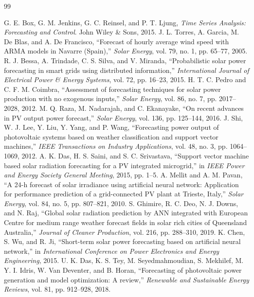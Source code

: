 \documentclass[conference]{IEEEtran}
\begin{document}
\begin{thebibliography}{99}

 G. E. Box, G. M. Jenkins, G. C. Reinsel, and P. T. Ljung, \textit{Time Series Analysis: Forecasting and Control}. John Wiley \& Sons, 2015.
 J. L. Torres, A. Garcia, M. De Blas, and A. De Francisco, ``Forecast of hourly average wind speed with ARMA models in Navarre (Spain),'' \textit{Solar Energy}, vol. 79, no. 1, pp. 65--77, 2005.
 R. J. Bessa, A. Trindade, C. S. Silva, and V. Miranda, ``Probabilistic solar power forecasting in smart grids using distributed information,'' \textit{International Journal of Electrical Power \& Energy Systems}, vol. 72, pp. 16--23, 2015.
 H. T. C. Pedro and C. F. M. Coimbra, ``Assessment of forecasting techniques for solar power production with no exogenous inputs,'' \textit{Solar Energy}, vol. 86, no. 7, pp. 2017--2028, 2012.
 M. Q. Raza, M. Nadarajah, and C. Ekanayake, ``On recent advances in PV output power forecast,'' \textit{Solar Energy}, vol. 136, pp. 125--144, 2016.
 J. Shi, W. J. Lee, Y. Liu, Y. Yang, and P. Wang, ``Forecasting power output of photovoltaic systems based on weather classification and support vector machines,'' \textit{IEEE Transactions on Industry Applications}, vol. 48, no. 3, pp. 1064--1069, 2012.
 A. K. Das, H. S. Saini, and S. C. Srivastava, ``Support vector machine based solar radiation forecasting for a PV integrated microgrid,'' in \textit{IEEE Power and Energy Society General Meeting}, 2015, pp. 1--5.
 A. Mellit and A. M. Pavan, ``A 24-h forecast of solar irradiance using artificial neural network: Application for performance prediction of a grid-connected PV plant at Trieste, Italy,'' \textit{Solar Energy}, vol. 84, no. 5, pp. 807--821, 2010.
 S. Ghimire, R. C. Deo, N. J. Downs, and N. Raj, ``Global solar radiation prediction by ANN integrated with European Centre for medium range weather forecast fields in solar rich cities of Queensland Australia,'' \textit{Journal of Cleaner Production}, vol. 216, pp. 288--310, 2019.
 K. Chen, S. Wu, and R. Ji, ``Short-term solar power forecasting based on artificial neural network,'' in \textit{International Conference on Power Electronics and Energy Engineering}, 2015.
 U. K. Das, K. S. Tey, M. Seyedmahmoudian, S. Mekhilef, M. Y. I. Idris, W. Van Deventer, and B. Horan, ``Forecasting of photovoltaic power generation and model optimization: A review,'' \textit{Renewable and Sustainable Energy Reviews}, vol. 81, pp. 912--928, 2018.

\end{thebibliography}
\end{document}
